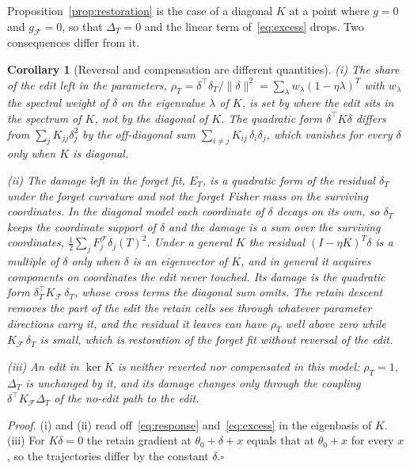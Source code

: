 \documentclass{article}
\newtheorem{corollary}{Corollary}
\begin{document}
Proposition~\ref{prop:restoration} is the case of a diagonal $K$ at a point where $g = 0$ and $g_{\mathcal{F}} = 0$, so that $\Delta_T = 0$ and the linear term of~\eqref{eq:excess} drops. Two consequences differ from it.
\begin{corollary}[Reversal and compensation are different quantities]
\label{cor:compensation}
(i) The share of the edit left in the parameters, $\rho_T = \delta^\top \delta_T / \|\delta\|^2 = \sum_\lambda w_\lambda (1 - \eta\lambda)^T$ with $w_\lambda$ the spectral weight of $\delta$ on the eigenvalue $\lambda$ of $K$, is set by where the edit sits in the spectrum of $K$, not by the diagonal of $K$. The quadratic form $\delta^\top K \delta$ differs from $\sum_j K_{jj} \delta_j^2$ by the off-diagonal sum $\sum_{i \neq j} K_{ij}\, \delta_i \delta_j$, which vanishes for every $\delta$ only when $K$ is diagonal.

(ii) The damage left in the forget fit, $E_T$, is a quadratic form of the residual $\delta_T$ under the forget curvature and not the forget Fisher mass on the surviving coordinates. In the diagonal model each coordinate of $\delta$ decays on its own, so $\delta_T$ keeps the coordinate support of $\delta$ and the damage is a sum over the surviving coordinates, $\tfrac12 \sum_j F^{\mathcal{F}}_j \delta_j(T)^2$. Under a general $K$ the residual $(I - \eta K)^T \delta$ is a multiple of $\delta$ only when $\delta$ is an eigenvector of $K$, and in general it acquires components on coordinates the edit never touched. Its damage is the quadratic form $\delta_T^\top K_{\mathcal{F}}\, \delta_T$, whose cross terms the diagonal sum omits. The retain descent removes the part of the edit the retain cells see through whatever parameter directions carry it, and the residual it leaves can have $\rho_T$ well above zero while $K_{\mathcal{F}}\, \delta_T$ is small, which is restoration of the forget fit without reversal of the edit.

(iii) An edit in $\ker K$ is neither reverted nor compensated in this model: $\rho_T = 1$, $\Delta_T$ is unchanged by it, and its damage changes only through the coupling $\delta^\top K_{\mathcal{F}} \Delta_T$ of the no-edit path to the edit.
\end{corollary}
\textit{Proof.} (i) and (ii) read off~\eqref{eq:response} and~\eqref{eq:excess} in the eigenbasis of $K$. (iii) For $K\delta = 0$ the retain gradient at $\theta_0 + \delta + x$ equals that at $\theta_0 + x$ for every $x$, so the trajectories differ by the constant $\delta$.\hfill$\square$
\end{document}
